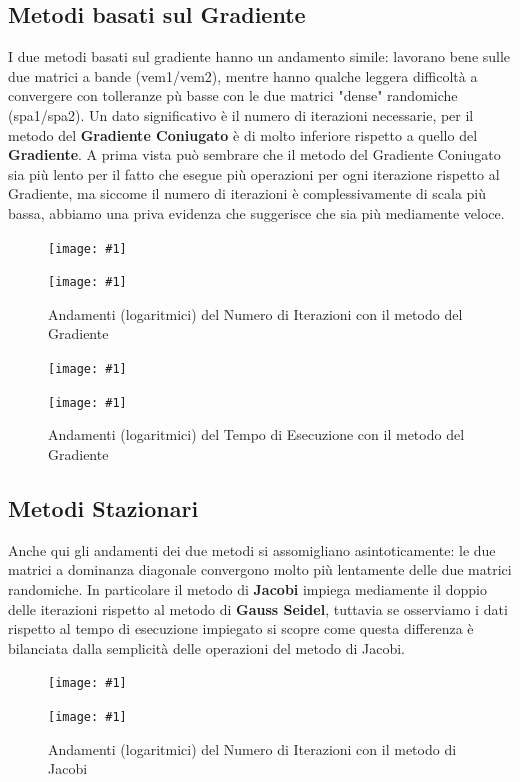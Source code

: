 \documentclass[a4paper,11pt,oneside, table]{article}
\newcommand{\putsubimage}[5] {
  \begin{minipage}{{#4}\linewidth}
	    \centering
      \texttt{[image: \#1]}
	    \caption{#2}\label{#3}
	\end{minipage}
}
\newcommand{\putimagecouple}[2] {
  \begin{figure}[!htb]
      \centering
      #1
      \hspace{0.5cm}
      #2
  \end{figure}
}
\begin{document}
\subsection{Metodi basati sul Gradiente}

I due metodi basati sul gradiente hanno un andamento simile: lavorano bene sulle due matrici a bande (vem1/vem2), mentre hanno qualche leggera difficolt\`a a convergere con tolleranze p\`u basse con le due matrici "dense" randomiche (spa1/spa2).
Un dato significativo \`e il numero di iterazioni necessarie, per il metodo del \textbf{Gradiente Coniugato} \`e di molto inferiore rispetto a quello del \textbf{Gradiente}. A prima vista pu\`o sembrare che il metodo del Gradiente Coniugato sia pi\`u lento per il fatto che esegue pi\`u operazioni per ogni iterazione rispetto al Gradiente, ma siccome il numero di iterazioni \`e complessivamente di scala pi\`u bassa, abbiamo una priva evidenza che suggerisce che sia pi\`u mediamente veloce.

\putimagecouple
  {\putsubimage{./images/it-re-cge.png}{Andamenti (logaritmici) del Numero di Iterazioni con il metodo del Gradiente Coniugato}{png:it-re-cge}{0.4}{0.99}}
  {\putsubimage{./images/it-re-gre.png}{Andamenti (logaritmici) del Numero di Iterazioni con il metodo del Gradiente}{png:it-re-gre}{0.4}{0.99}}

\putimagecouple
  {\putsubimage{./images/te-re-cge.png}{Andamenti (logaritmici) del Tempo di Esecuzione con il metodo del Gradiente Coniugato}{png:te-re-cge}{0.4}{0.99}}
  {\putsubimage{./images/te-re-gre.png}{Andamenti (logaritmici) del Tempo di Esecuzione con il metodo del Gradiente}{png:te-re-gre}{0.4}{0.99}}

\subsection{Metodi Stazionari}

Anche qui gli andamenti dei due metodi si assomigliano asintoticamente: le due matrici a dominanza diagonale convergono molto pi\`u lentamente delle due matrici randomiche. In particolare il metodo di \textbf{Jacobi} impiega mediamente il doppio delle iterazioni rispetto al metodo di \textbf{Gauss Seidel}, tuttavia se osserviamo i dati rispetto al tempo di esecuzione impiegato si scopre come questa differenza \`e bilanciata dalla semplicit\`a delle operazioni del metodo di Jacobi.

\putimagecouple
  {\putsubimage{./images/it-re-gse.png}{Andamenti (logaritmici) del Numero di Iterazioni con il metodo di Gauss Seidel}{png:it-re-gse}{0.4}{0.99}}
  {\putsubimage{./images/it-re-jae.png}{Andamenti (logaritmici) del Numero di Iterazioni con il metodo di Jacobi}{png:it-re-jae}{0.4}{0.99}}
\end{document}
